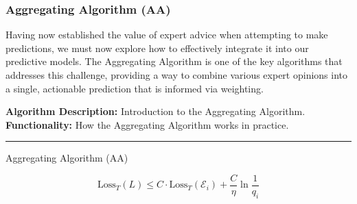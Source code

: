 \subsubsection{Aggregating Algorithm (AA)}
Having now established the value of expert advice when attempting to make predictions, we must now explore how to effectively integrate it into our predictive models. The Aggregating Algorithm is one of the key algorithms that addresses this challenge, providing a way to combine various expert opinions into a single, actionable prediction that is informed via weighting.

\textbf{Algorithm Description:} Introduction to the Aggregating Algorithm.\newline
\textbf{Functionality:} How the Aggregating Algorithm works in practice.\newline
\noindent\rule{\textwidth}{0.1pt}
\begin{algorithm}[H]
    \caption{Aggregating Algorithm (AA)}\label{aggregationg_algorithm}
    \begin{algorithmic}[1]
    \end{algorithmic}
\end{algorithm}

\begin{equation}
    \text{Loss}_T(L) \leq C \cdot \text{Loss}_T(\mathcal{E}_i) + \frac{C}{\eta}\ln\frac{1}{q_i}
\end{equation}

